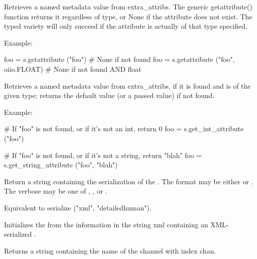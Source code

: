 Retrieves a named metadata value from {\cf extra_attribs}.  The generic
{\cf getattribute()} function returns it regardless of type, or {\cf None}
if the attribute does not exist.  The typed variety will only succeed
if the attribute is actually of that type specified.

\noindent Example:
\begin{code}
    foo = s.getattribute ("foo")   # None if not found
    foo = s.getattribute ("foo", oiio.FLOAT)  # None if not found AND float
\end{code}
\apiend

Retrieves a named metadata value from {\cf extra_attribs}, if it is
found and is of the given type; returns the default value (or a passed
value) if not found.

\noindent Example:
\begin{code}
    # If "foo" is not found, or if it's not an int, return 0
    foo = s.get_int_attribute ("foo")

    # If "foo" is not found, or if it's not a string, return "blah"
    foo = s.get_string_attribute ("foo", "blah")
\end{code}
\apiend


\NEW %
Return a string containing the serialization of the \ImageSpec. The {\cf format}
may be either  or . The {\cf verbose} may be one of
, , or .
\apiend

\NEW %
Equivalent to {\cf serialize ("xml", "detailedhuman")}.
\apiend

\NEW %
Initializes the \ImageSpec from the information in the string {\cf xml}
containing an XML-serialized \ImageSpec.
\apiend

\NEW %
Returns a string containing the name of the channel with index {\cf chan}.
\apiend

